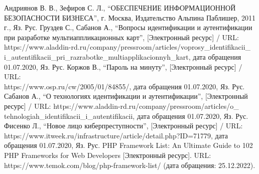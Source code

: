 \begin{thebibliography}{99}
   Андриянов В. В., Зефиров С. Л., ``ОБЕСПЕЧЕНИЕ ИНФОРМАЦИОННОЙ БЕЗОПАСНОСТИ БИЗНЕСА'', г. Москва, Издательство Альпина Паблишер, 2011 г., Яз. Рус.
   Груздев С., Сабанов А., ``Вопросы идентификации и аутентификации при разработке мультиаппликационных карт'', [Электронный ресурс] / URL:\\ https://www.aladdin-rd.ru/company/pressroom/articles/voprosy\_identifikacii\_\\i\_autentifikacii\_pri\_razrabotke\_multiapplikacionnyh\_kart, дата обращения 01.07.2020, Яз. Рус.
   Коржов В., ``Пароль на минуту'', [Электронный ресурс] / URL: \\https://www.osp.ru/cw/2005/01/84855/, дата обращения 01.07.2020, Яз. Рус.
   Сабанов А., ``О технологиях идентификации и аутентификации'', [Электронный ресурс] / URL: https://www.aladdin-rd.ru/company/pressroom/articles/o\_\\tehnologiah\_identifikacii\_i\_autentifikacii, дата обращения 01.07.2020, Яз. Рус.
   Фисенко Л., ``Новое лицо киберпреступности'', [Электронный ресурс] / URL:\\https://www.itweek.ru/infrastructure/article/detail.php?ID=71779, дата обращения 01.07.2020, Яз. Рус.
   PHP Framework List: An Ultimate Guide to 102 PHP Frameworks for Web Developers [Электронный ресурс]. URL: https://www.temok.com/blog/php-framework-list/ (дата обращения: 25.12.2022).
\end{thebibliography}